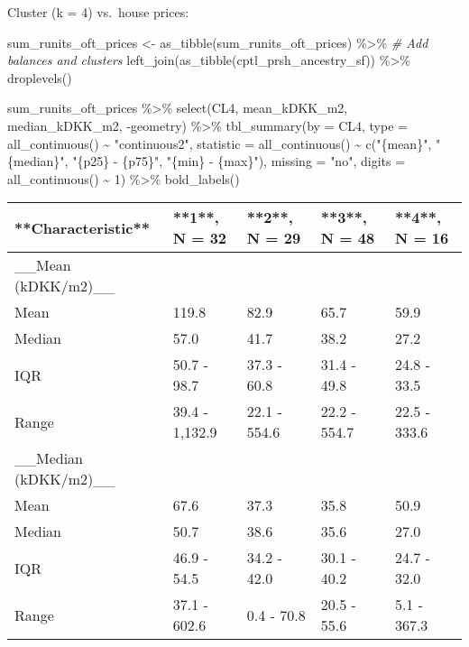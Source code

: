 \documentclass[
  12pt,
]{article}
\newenvironment{Shaded}{\begin{snugshade}}{\end{snugshade}}
\newcommand{\AttributeTok}[1]{\textcolor[rgb]{0.77,0.63,0.00}{#1}}
\newcommand{\CommentTok}[1]{\textcolor[rgb]{0.56,0.35,0.01}{\textit{#1}}}
\newcommand{\DecValTok}[1]{\textcolor[rgb]{0.00,0.00,0.81}{#1}}
\newcommand{\FunctionTok}[1]{\textcolor[rgb]{0.00,0.00,0.00}{#1}}
\newcommand{\NormalTok}[1]{#1}
\newcommand{\OtherTok}[1]{\textcolor[rgb]{0.56,0.35,0.01}{#1}}
\newcommand{\SpecialCharTok}[1]{\textcolor[rgb]{0.00,0.00,0.00}{#1}}
\newcommand{\StringTok}[1]{\textcolor[rgb]{0.31,0.60,0.02}{#1}}
\begin{document}
Cluster (k = 4) vs.~house prices:

\begin{Shaded}
\begin{Highlighting}[]
\NormalTok{sum\_runits\_oft\_prices }\OtherTok{\textless{}{-}} \FunctionTok{as\_tibble}\NormalTok{(sum\_runits\_oft\_prices) }\SpecialCharTok{\%\textgreater{}\%}
  \CommentTok{\# Add balances and clusters }
  \FunctionTok{left\_join}\NormalTok{(}\FunctionTok{as\_tibble}\NormalTok{(cptl\_prsh\_ancestry\_sf)) }\SpecialCharTok{\%\textgreater{}\%} 
  \FunctionTok{droplevels}\NormalTok{() }

\NormalTok{sum\_runits\_oft\_prices }\SpecialCharTok{\%\textgreater{}\%} 
  \FunctionTok{select}\NormalTok{(CL4, mean\_kDKK\_m2, median\_kDKK\_m2, }\SpecialCharTok{{-}}\NormalTok{geometry) }\SpecialCharTok{\%\textgreater{}\%} 
  \FunctionTok{tbl\_summary}\NormalTok{(}\AttributeTok{by =}\NormalTok{ CL4,}
              \AttributeTok{type =} \FunctionTok{all\_continuous}\NormalTok{() }\SpecialCharTok{\textasciitilde{}} \StringTok{"continuous2"}\NormalTok{,}
              \AttributeTok{statistic =} \FunctionTok{all\_continuous}\NormalTok{() }\SpecialCharTok{\textasciitilde{}} \FunctionTok{c}\NormalTok{(}\StringTok{"\{mean\}"}\NormalTok{,}
                                               \StringTok{"\{median\}"}\NormalTok{,}
                                               \StringTok{"\{p25\} {-} \{p75\}"}\NormalTok{,}
                                               \StringTok{"\{min\} {-} \{max\}"}\NormalTok{),}
              \AttributeTok{missing =} \StringTok{"no"}\NormalTok{,}
              \AttributeTok{digits =} \FunctionTok{all\_continuous}\NormalTok{() }\SpecialCharTok{\textasciitilde{}} \DecValTok{1}\NormalTok{) }\SpecialCharTok{\%\textgreater{}\%}
  \FunctionTok{bold\_labels}\NormalTok{()}
\end{Highlighting}
\end{Shaded}

\begin{tabular}{l|l|l|l|l}
\hline
**Characteristic** & **1**, N = 32 & **2**, N = 29 & **3**, N = 48 & **4**, N = 16\\
\hline
\_\_Mean (kDKK/m2)\_\_ &  &  &  & \\
\hline
Mean & 119.8 & 82.9 & 65.7 & 59.9\\
\hline
Median & 57.0 & 41.7 & 38.2 & 27.2\\
\hline
IQR & 50.7 - 98.7 & 37.3 - 60.8 & 31.4 - 49.8 & 24.8 - 33.5\\
\hline
Range & 39.4 - 1,132.9 & 22.1 - 554.6 & 22.2 - 554.7 & 22.5 - 333.6\\
\hline
\_\_Median (kDKK/m2)\_\_ &  &  &  & \\
\hline
Mean & 67.6 & 37.3 & 35.8 & 50.9\\
\hline
Median & 50.7 & 38.6 & 35.6 & 27.0\\
\hline
IQR & 46.9 - 54.5 & 34.2 - 42.0 & 30.1 - 40.2 & 24.7 - 32.0\\
\hline
Range & 37.1 - 602.6 & 0.4 - 70.8 & 20.5 - 55.6 & 5.1 - 367.3\\
\hline
\end{tabular}
\end{document}
